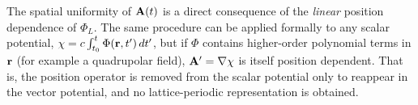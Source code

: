 The spatial uniformity of $\vb{A}(t)$ is a direct consequence of the
\emph{linear} position dependence of $\Phi_L$. The same procedure can be applied
formally to any scalar potential, $\chi = c\int_{t_0}^{t}\Phi(\vb{r},t')\,dt'$,
but if $\Phi$ contains higher-order polynomial terms in $\vb{r}$ (for example
a quadrupolar field), $\vb{A}'=\nabla\chi$ is itself position dependent. That is,
the position operator is removed from the scalar potential only to reappear in the
vector potential, and no lattice-periodic representation is obtained.







